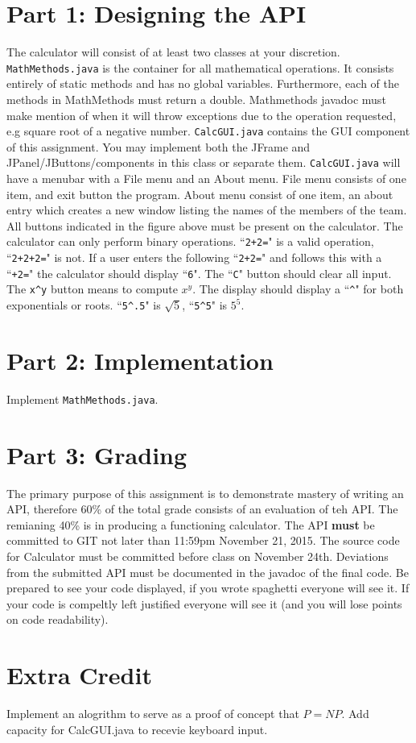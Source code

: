 \documentclass[]{simple}
\begin{document}
\section{Part 1: Designing the API}
The calculator will consist of at least two classes at your discretion.
\verb|MathMethods.java| is the container for all mathematical operations.
It consists entirely of static methods and has no global variables.
Furthermore, each of the methods in MathMethods must return a double.
Mathmethods javadoc must make mention of when it will throw exceptions due to the operation requested, e.g square root of a negative number.
\verb|CalcGUI.java| contains the GUI component of this assignment.
You may implement both the JFrame and JPanel/JButtons/components in this class or separate them.
\verb|CalcGUI.java| will have a menubar with a File menu and an About menu.
File menu consists of one item, and exit button the program.
About menu consist of one item, an about entry which creates a new window listing the names of the members of the team.
All buttons indicated in the figure above must be present on the calculator.
The calculator can only perform binary operations. ``\verb|2+2=|" is a valid operation, ``\verb|2+2+2=|" is not. 
If a user enters the following ``\verb|2+2=|" and follows this with a ``\verb|+2=|" the calculator should display ``\verb|6|".
The ``\verb|C|" button should clear all input.
The \verb|x^y| button means to compute $x^y$.
The display should display a ``\verb|^|" for both exponentials or roots. ``\verb|5^.5|" is $\sqrt{5}$, ``\verb|5^5|" is $5^{5}$.

\section{Part 2: Implementation}
Implement \verb|MathMethods.java|.

\section {Part 3: Grading}
The primary purpose of this assignment is to demonstrate mastery of writing an API, therefore 60\% of the total grade consists of an evaluation of teh API.
The remianing 40\% is in producing a functioning calculator. The API \textbf{must} be committed to GIT not later than 11:59pm November 21, 2015. The source code for Calculator must be committed before class on November 24th. Deviations from the submitted API must be documented in the javadoc of the final code. Be prepared to see your code displayed, if you wrote spaghetti everyone will see it. If your code is compeltly left justified everyone will see it (and you will lose points on code readability).

\section{Extra Credit}
Implement an alogrithm to serve as a proof of concept that $P=NP$.
Add capacity for CalcGUI.java to recevie keyboard input.
\end{document}
